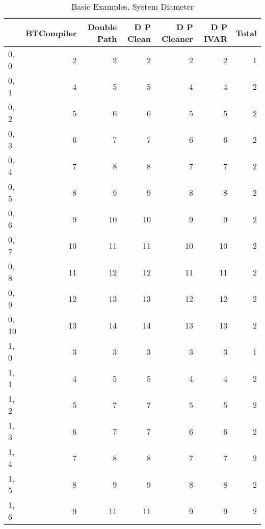 \begin{table}
\centering
\caption{Basic Examples, System Diameter}
\label{b_e_diam}
\begin{tabular}{lrrrrrr}
\toprule
{} &  BTCompiler &  Double Path &  D P Clean &  D P Cleaner &  D P IVAR &  Total \\
\midrule
0, 0   &           2 &            2 &          2 &            2 &         2 &      1 \\
0, 1   &           4 &            5 &          5 &            4 &         4 &      2 \\
0, 2   &           5 &            6 &          6 &            5 &         5 &      2 \\
0, 3   &           6 &            7 &          7 &            6 &         6 &      2 \\
0, 4   &           7 &            8 &          8 &            7 &         7 &      2 \\
0, 5   &           8 &            9 &          9 &            8 &         8 &      2 \\
0, 6   &           9 &           10 &         10 &            9 &         9 &      2 \\
0, 7   &          10 &           11 &         11 &           10 &        10 &      2 \\
0, 8   &          11 &           12 &         12 &           11 &        11 &      2 \\
0, 9   &          12 &           13 &         13 &           12 &        12 &      2 \\
0, 10  &          13 &           14 &         14 &           13 &        13 &      2 \\
1, 0   &           3 &            3 &          3 &            3 &         3 &      1 \\
1, 1   &           4 &            5 &          5 &            4 &         4 &      2 \\
1, 2   &           5 &            7 &          7 &            5 &         5 &      2 \\
1, 3   &           6 &            7 &          7 &            6 &         6 &      2 \\
1, 4   &           7 &            8 &          8 &            7 &         7 &      2 \\
1, 5   &           8 &            9 &          9 &            8 &         8 &      2 \\
1, 6   &           9 &           11 &         11 &            9 &         9 &      2 \\

\end{tabular}
\end{table}
